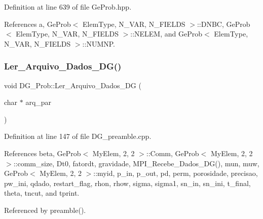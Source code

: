 Definition at line 639 of file Ge\+Prob.\+hpp.



References a, Ge\+Prob$<$ Elem\+Type, N\+\_\+\+V\+A\+R, N\+\_\+\+F\+I\+E\+L\+D\+S $>$\+::\+D\+N\+BC, Ge\+Prob$<$ Elem\+Type, N\+\_\+\+V\+A\+R, N\+\_\+\+F\+I\+E\+L\+D\+S $>$\+::\+N\+E\+L\+EM, and Ge\+Prob$<$ Elem\+Type, N\+\_\+\+V\+A\+R, N\+\_\+\+F\+I\+E\+L\+D\+S $>$\+::\+N\+U\+M\+NP.

\mbox{\label{classDG__Prob_ab28a5690b7fc91e44fe435107a4076ae}} 
\subsubsection{\texorpdfstring{Ler\+\_\+\+Arquivo\+\_\+\+Dados\+\_\+\+D\+G()}{Ler\_Arquivo\_Dados\_DG()}}
{\footnotesize\ttfamily void D\+G\+\_\+\+Prob\+::\+Ler\+\_\+\+Arquivo\+\_\+\+Dados\+\_\+\+DG (\begin{DoxyParamCaption}\item[{char $\ast$}]{arq\+\_\+par }\end{DoxyParamCaption})}



Definition at line 147 of file D\+G\+\_\+preamble.\+cpp.



References beta, Ge\+Prob$<$ My\+Elem, 2, 2 $>$\+::\+Comm, Ge\+Prob$<$ My\+Elem, 2, 2 $>$\+::comm\+\_\+size, Dt0, fatordt, gravidade, M\+P\+I\+\_\+\+Recebe\+\_\+\+Dados\+\_\+\+D\+G(), mun, muw, Ge\+Prob$<$ My\+Elem, 2, 2 $>$\+::myid, p\+\_\+in, p\+\_\+out, pd, perm, porosidade, precisao, pw\+\_\+ini, qdado, restart\+\_\+flag, rhon, rhow, sigma, sigma1, sn\+\_\+in, sn\+\_\+ini, t\+\_\+final, theta, tncut, and tprint.



Referenced by preamble().

